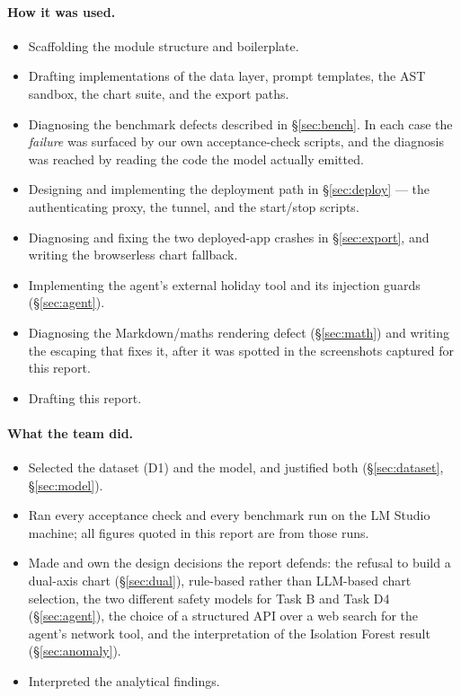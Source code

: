 \documentclass[11pt,a4paper]{article}
\begin{document}
\paragraph{How it was used.}
\begin{itemize}[leftmargin=*]
\item Scaffolding the module structure and boilerplate.
\item Drafting implementations of the data layer, prompt templates, the AST sandbox, the
      chart suite, and the export paths.
\item Diagnosing the benchmark defects described in \S\ref{sec:bench}. In each case the
      \emph{failure} was surfaced by our own acceptance-check scripts, and the diagnosis
      was reached by reading the code the model actually emitted.
\item Designing and implementing the deployment path in \S\ref{sec:deploy} --- the
      authenticating proxy, the tunnel, and the start/stop scripts.
\item Diagnosing and fixing the two deployed-app crashes in \S\ref{sec:export}, and
      writing the browserless chart fallback.
\item Implementing the agent's external holiday tool and its injection guards
      (\S\ref{sec:agent}).
\item Diagnosing the Markdown/maths rendering defect (\S\ref{sec:math}) and writing
      the escaping that fixes it, after it was spotted in the screenshots captured
      for this report.
\item Drafting this report.
\end{itemize}

\paragraph{What the team did.}
\begin{itemize}[leftmargin=*]
\item Selected the dataset (D1) and the model, and justified both
      (\S\ref{sec:dataset}, \S\ref{sec:model}).
\item Ran every acceptance check and every benchmark run on the LM Studio machine; all
      figures quoted in this report are from those runs.
\item Made and own the design decisions the report defends: the refusal to build a
      dual-axis chart (\S\ref{sec:dual}), rule-based rather than LLM-based chart
      selection, the two different safety models for Task B and Task D4
      (\S\ref{sec:agent}), the choice of a structured API over a web search for the
      agent's network tool, and the interpretation of the Isolation Forest result
      (\S\ref{sec:anomaly}).
\item Interpreted the analytical findings.
\end{itemize}
\end{document}
